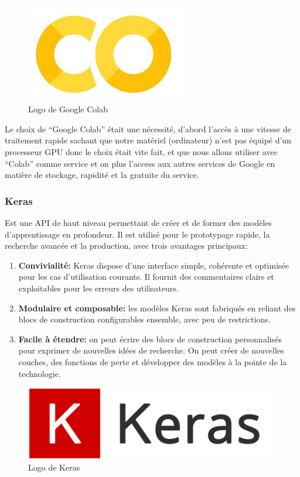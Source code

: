 \documentclass[12pt]{article}
\begin{document}
\begin{figure}[h]
	\centering
	\includegraphics[width=7cm]{img-Chapiter-4/colab.png}
	\caption{Logo de Google Colab}
\end{figure}

Le choix de “Google Colab” était une nécessité, d’abord l’accès à une vitesse de traitement rapide sachant que notre matériel (ordinateur) n’est pas équipé d’un processeur GPU donc le choix était vite fait, et que nous allons utiliser avec “Colab” comme service et on plus l’access aux autres services de Google en matière de stockage, rapidité et la gratuite du service.

\subsubsection*{Keras}
Est une API de haut niveau permettant de créer et de former des modèles d'apprentissage en profondeur. Il est utilisé pour le prototypage rapide, la recherche avancée et la production, avec trois avantages principaux:
\begin{enumerate}
	\item \textbf{Convivialité:} Keras dispose d'une interface simple, cohérente et optimisée pour les cas d'utilisation courants. Il fournit des commentaires clairs et exploitables pour les erreurs des utilisateurs.
	\item \textbf{Modulaire et composable:} les modèles Keras sont fabriqués en reliant des blocs de construction configurables ensemble, avec peu de restrictions.
	\item \textbf{Facile à étendre:} on peut écrire des blocs de construction personnalisés pour exprimer de nouvelles idées de recherche. On peut créer de nouvelles couches, des fonctions de perte et développer des modèles à la pointe de la technologie.
\end{enumerate}

\begin{figure}[h]
	\centering
	\includegraphics[width=12cm]{img-Chapiter-4/keras.png}
	\caption{Logo de Keras}
\end{figure}
\end{document}
